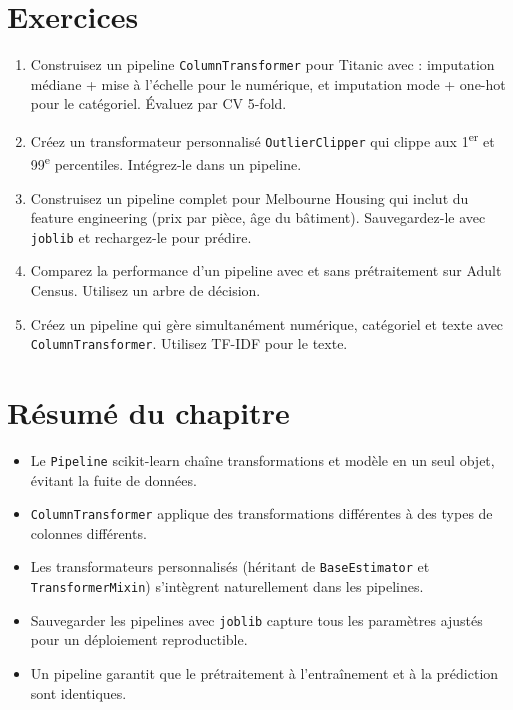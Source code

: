 \section{Exercices}

\begin{exercise}
\begin{enumerate}
  \item Construisez un pipeline \texttt{ColumnTransformer} pour Titanic avec : imputation m\'ediane + mise \`a l'\'echelle pour le num\'erique, et imputation mode + one-hot pour le cat\'egoriel. \'Evaluez par CV 5-fold.
  \item Cr\'eez un transformateur personnalis\'e \texttt{OutlierClipper} qui clippe aux 1\textsuperscript{er} et 99\textsuperscript{e} percentiles. Int\'egrez-le dans un pipeline.
  \item Construisez un pipeline complet pour Melbourne Housing qui inclut du feature engineering (prix par pi\`ece, \^age du b\^atiment). Sauvegardez-le avec \texttt{joblib} et rechargez-le pour pr\'edire.
  \item Comparez la performance d'un pipeline avec et sans pr\'etraitement sur Adult Census. Utilisez un arbre de d\'ecision.
  \item Cr\'eez un pipeline qui g\`ere simultan\'ement num\'erique, cat\'egoriel et texte avec \texttt{ColumnTransformer}. Utilisez TF-IDF pour le texte.
\end{enumerate}
\end{exercise}

\section{R\'esum\'e du chapitre}

\begin{itemize}
  \item Le \texttt{Pipeline} scikit-learn cha\^ine transformations et mod\`ele en un seul objet, \'evitant la fuite de donn\'ees.
  \item \texttt{ColumnTransformer} applique des transformations diff\'erentes \`a des types de colonnes diff\'erents.
  \item Les transformateurs personnalis\'es (h\'eritant de \texttt{BaseEstimator} et \texttt{TransformerMixin}) s'int\`egrent naturellement dans les pipelines.
  \item Sauvegarder les pipelines avec \texttt{joblib} capture tous les param\`etres ajust\'es pour un d\'eploiement reproductible.
  \item Un pipeline garantit que le pr\'etraitement \`a l'entra\^inement et \`a la pr\'ediction sont identiques.
\end{itemize}
